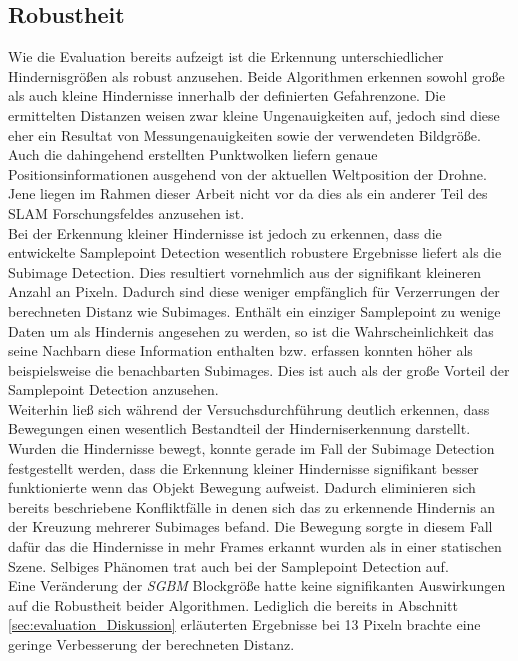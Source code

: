 \subsection{Robustheit}
\label{subsec:discussion_robustness}
Wie die Evaluation bereits aufzeigt ist die Erkennung unterschiedlicher Hindernisgrößen als robust anzusehen. Beide Algorithmen erkennen sowohl große als auch kleine Hindernisse innerhalb der definierten Gefahrenzone. Die ermittelten Distanzen weisen zwar kleine Ungenauigkeiten auf, jedoch sind diese eher ein Resultat von Messungenauigkeiten sowie der verwendeten Bildgröße. Auch die dahingehend erstellten Punktwolken liefern genaue Positionsinformationen ausgehend von der aktuellen Weltposition der Drohne. Jene liegen im Rahmen dieser Arbeit nicht vor da dies als ein anderer Teil des SLAM Forschungsfeldes anzusehen ist.\\


\noindent
Bei der Erkennung kleiner Hindernisse ist jedoch zu erkennen, dass die entwickelte Samplepoint Detection wesentlich robustere Ergebnisse liefert als die Subimage Detection. Dies resultiert vornehmlich aus der signifikant kleineren Anzahl an Pixeln. Dadurch sind diese weniger empfänglich für Verzerrungen der berechneten Distanz wie Subimages. Enthält ein einziger Samplepoint zu wenige Daten um als Hindernis angesehen zu werden, so ist die Wahrscheinlichkeit das seine Nachbarn diese Information enthalten bzw. erfassen konnten höher als beispielsweise die benachbarten Subimages. Dies ist auch als der große Vorteil der Samplepoint Detection anzusehen.\\

\noindent
Weiterhin ließ sich während der Versuchsdurchführung deutlich erkennen, dass Bewegungen einen wesentlich Bestandteil der Hinderniserkennung darstellt. Wurden die Hindernisse bewegt, konnte gerade im Fall der Subimage Detection festgestellt werden, dass die Erkennung kleiner Hindernisse signifikant besser funktionierte wenn das Objekt Bewegung aufweist. Dadurch eliminieren sich bereits beschriebene Konfliktfälle in denen sich das zu erkennende Hindernis an der Kreuzung mehrerer Subimages befand. Die Bewegung sorgte in diesem Fall dafür das die Hindernisse in mehr Frames erkannt wurden als in einer statischen Szene. Selbiges Phänomen trat auch bei der Samplepoint Detection auf.\\

\noindent
Eine Veränderung der \emph{SGBM} Blockgröße hatte keine signifikanten Auswirkungen auf die Robustheit beider Algorithmen. Lediglich die bereits in Abschnitt \ref{sec:evaluation_Diskussion} erläuterten Ergebnisse bei 13 Pixeln brachte eine geringe Verbesserung der berechneten Distanz.\\

